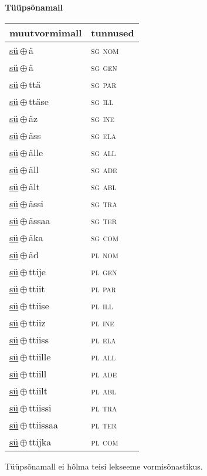 

\vspace{3.5em}
\noindent \begin{minipage}{\textwidth}
\noindent \textbf{Tüüpsõnamall \,}\\

\begin{sideways}
\begin{tabular}{l l}
muutvormimall & tunnused \\
\hline
\underline{sü}\,$\oplus$\,ä & \textsc{ sg nom } \\
\underline{sü}\,$\oplus$\,ä & \textsc{ sg gen } \\
\underline{sü}\,$\oplus$\,ttä & \textsc{ sg par } \\
\underline{sü}\,$\oplus$\,ttäse & \textsc{ sg ill } \\
\underline{sü}\,$\oplus$\,äz & \textsc{ sg ine } \\
\underline{sü}\,$\oplus$\,äss & \textsc{ sg ela } \\
\underline{sü}\,$\oplus$\,älle & \textsc{ sg all } \\
\underline{sü}\,$\oplus$\,äll & \textsc{ sg ade } \\
\underline{sü}\,$\oplus$\,ält & \textsc{ sg abl } \\
\underline{sü}\,$\oplus$\,ässi & \textsc{ sg tra } \\
\underline{sü}\,$\oplus$\,ässaa & \textsc{ sg ter } \\
\underline{sü}\,$\oplus$\,äka & \textsc{ sg com } \\
\underline{sü}\,$\oplus$\,äd & \textsc{ pl nom } \\
\underline{sü}\,$\oplus$\,ttije & \textsc{ pl gen } \\
\underline{sü}\,$\oplus$\,ttiit & \textsc{ pl par } \\
\underline{sü}\,$\oplus$\,ttiise & \textsc{ pl ill } \\
\underline{sü}\,$\oplus$\,ttiiz & \textsc{ pl ine } \\
\underline{sü}\,$\oplus$\,ttiiss & \textsc{ pl ela } \\
\underline{sü}\,$\oplus$\,ttiille & \textsc{ pl all } \\
\underline{sü}\,$\oplus$\,ttiill & \textsc{ pl ade } \\
\underline{sü}\,$\oplus$\,ttiilt & \textsc{ pl abl } \\
\underline{sü}\,$\oplus$\,ttiissi & \textsc{ pl tra } \\
\underline{sü}\,$\oplus$\,ttiissaa & \textsc{ pl ter } \\
\underline{sü}\,$\oplus$\,ttijka & \textsc{ pl com } \\
\end{tabular}
\end{sideways}
\label{tab:tüüpsõnamall-süä}

\end{minipage}

 
\vspace{1em}
\noindent Tüüpsõnamall  ei hõlma teisi lekseeme vormi\-sõnastikus.

